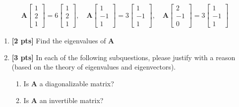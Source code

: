 \documentclass[11pt,addpoints,answers]{exam}
\numberwithin{equation}{section} %
\numberwithin{figure}{section} %
\numberwithin{table}{section} %
\begin{document}
\begin{questions}
    \begin{align*}
    \mathbf{A} \begin{bmatrix}
        1 \\2 \\1
    \end{bmatrix} = 6\begin{bmatrix}
        1 \\ 2 \\1
    \end{bmatrix}, \quad \mathbf{A}\begin{bmatrix}
        1 \\ -1 \\ 1
    \end{bmatrix} = 3 \begin{bmatrix}
        1 \\ -1 \\ 1
    \end{bmatrix}, \quad \mathbf{A} \begin{bmatrix}
        2 \\ -1 \\ 0
    \end{bmatrix} = 3 \begin{bmatrix}
        1 \\ -1 \\ 1
    \end{bmatrix}
    \end{align*}
    \begin{enumerate}[label=\Roman*]
        \item \textbf{[2 pts]} Find the eigenvalues of $\mathbf{A}$
        \item \textbf{[3 pts]} In each of the following subquestions, please justify with a reason (based on the theory of eigenvalues and eigenvectors).
        \begin{enumerate}
            \item Is $\mathbf{A}$ a diagonalizable matrix?
            \item Is $\mathbf{A}$ an invertible matrix?
        \end{enumerate}

    \end{enumerate}
    \begin{tcolorbox}[fit,height=3cm, width=\textwidth, blank, borderline={0.5pt}{-2pt},halign=center, valign=center, nobeforeafter]
    \end{tcolorbox}     
    
\end{questions}
\end{document}

